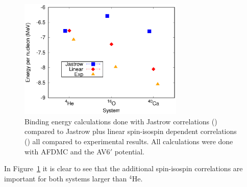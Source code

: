 \begin{figure}[h!]
   \centering
   \includegraphics[width=0.7\textwidth]{figures/energy_jaslin.eps}
   \caption{Binding energy calculations done with Jastrow correlations (\cite{gandolfi2007}) compared to Jastrow plus linear spin-isospin dependent correlations (\cite{gandolfi2014}) all compared to experimental results. All calculations were done with AFDMC and the AV6$'$ potential.}
   \label{fig:energy_jaslin}
\end{figure}
In Figure~\ref{fig:energy_jaslin} it is clear to see that the additional spin-isospin correlations are important for both systems larger than $^4$He.

